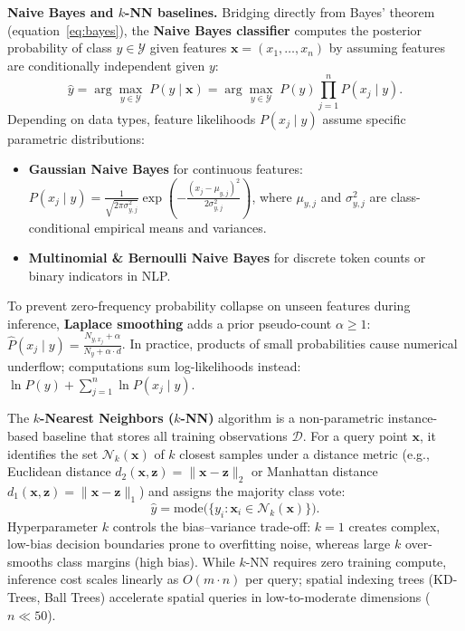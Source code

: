 \documentclass[11pt,a4paper]{article}
\begin{document}
	\textbf{Naive Bayes and $k$-NN baselines.} Bridging directly from Bayes' theorem (equation~\ref{eq:bayes}), the \textbf{Naive Bayes classifier} computes the posterior probability of class $y \in \mathcal{Y}$ given features $\mathbf{x} = (x_1, \dots, x_n)$ by assuming features are conditionally independent given $y$:
	\begin{equation}
		\hat{y} = \arg\max_{y \in \mathcal{Y}}\; P(y \mid \mathbf{x}) = \arg\max_{y \in \mathcal{Y}}\; P(y) \prod_{j=1}^{n} P(x_j \mid y).
	\end{equation}
	Depending on data types, feature likelihoods $P(x_j \mid y)$ assume specific parametric distributions:
	\begin{itemize}[nosep]
		\item \textbf{Gaussian Naive Bayes} for continuous features: $P(x_j \mid y) = \frac{1}{\sqrt{2\pi\sigma_{y,j}^2}} \exp\left(-\frac{(x_j - \mu_{y,j})^2}{2\sigma_{y,j}^2}\right)$, where $\mu_{y,j}$ and $\sigma_{y,j}^2$ are class-conditional empirical means and variances.
		\item \textbf{Multinomial \& Bernoulli Naive Bayes} for discrete token counts or binary indicators in NLP.
	\end{itemize}
	To prevent zero-frequency probability collapse on unseen features during inference, \textbf{Laplace smoothing} adds a prior pseudo-count $\alpha \ge 1$: $\hat{P}(x_j \mid y) = \frac{N_{y, x_j} + \alpha}{N_y + \alpha \cdot d}$. In practice, products of small probabilities cause numerical underflow; computations sum log-likelihoods instead: $\ln P(y) + \sum_{j=1}^n \ln P(x_j \mid y)$.

	The \textbf{$k$-Nearest Neighbors ($k$-NN)} algorithm is a non-parametric instance-based baseline that stores all training observations $\mathcal{D}$. For a query point $\mathbf{x}$, it identifies the set $\mathcal{N}_k(\mathbf{x})$ of $k$ closest samples under a distance metric (e.g., Euclidean distance $d_2(\mathbf{x}, \mathbf{z}) = \|\mathbf{x} - \mathbf{z}\|_2$ or Manhattan distance $d_1(\mathbf{x}, \mathbf{z}) = \|\mathbf{x} - \mathbf{z}\|_1$) and assigns the majority class vote:
	\begin{equation}
		\hat{y} = \mathrm{mode}\bigl(\{y_i : \mathbf{x}_i \in \mathcal{N}_k(\mathbf{x})\}\bigr).
	\end{equation}
	Hyperparameter $k$ controls the bias--variance trade-off: $k=1$ creates complex, low-bias decision boundaries prone to overfitting noise, whereas large $k$ over-smooths class margins (high bias). While $k$-NN requires zero training compute, inference cost scales linearly as $O(m \cdot n)$ per query; spatial indexing trees (KD-Trees, Ball Trees) accelerate spatial queries in low-to-moderate dimensions ($n \ll 50$).
\end{document}
